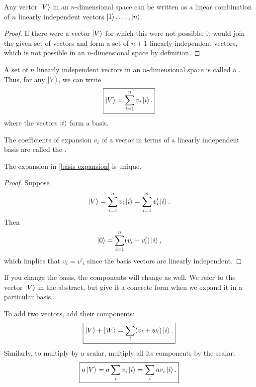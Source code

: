 \begin{theorem}\label{linear basis theorem}
Any vector $\ket{V}$ in an $n$-dimensional space can be written as a linear combination of $n$ linearly independent vectors $\ket{1}, \dots, \ket{n}$.
\end{theorem}

\begin{proof}
If there were a vector $\ket{V}$ for which this were not possible, it would join the given set of vectors and form a set of $n + 1$ linearly independent vectors, which is not possible in an $n$-dimensional space by definition.
\end{proof}

\begin{shaded*}
A set of $n$ linearly independent vectors in an $n$-dimensional space is called a . Thus, for any $\ket{V}$, we can write
\begin{equation}\label{basis expansion}
    \boxed{\ket{V} = \sum_{i = 1}^n v_i \ket{i},}
\end{equation}
where the vectors $\ket{i}$ form a basis.
\end{shaded*}

The coefficients of expansion $v_i$ of a vector in terms of a linearly independent basis are called the .

\begin{theorem}\label{unique basis expansion}
The expansion in \eqref{basis expansion} is unique.
\end{theorem}

\begin{proof}
Suppose 
\begin{equation*}
    \ket{V} = \sum_{i = 1}^n v_i \ket{i}
            = \sum_{i = 1}^n v'_i \ket{i}.
\end{equation*}
Then
\begin{equation*}
    \ket{0} = \sum_{i = 1}^n (v_i - v'_i) \ket{i},
\end{equation*}
which implies that $v_i = v'_i$ since the basis vectors are linearly independent.
\end{proof}

\begin{remark}
If you change the basis, the components will change as well. We refer to the vector $\ket{V}$ in the abstract, but give it a concrete form when we expand it in a particular basis.
\end{remark}

To add two vectors, add their components:
\begin{equation}\label{component vector addition}
    \boxed{\ket{V} + \ket{W} = \sum_i (v_i + w_i) \ket{i}.}
\end{equation}
Similarly, to multiply by a scalar, multiply all its components by the scalar:
\begin{equation}\label{component scalar multiplication}
    \boxed{a\ket{V} = a \sum_i v_i \ket{i} = \sum_i av_i \ket{i}.}
\end{equation}

